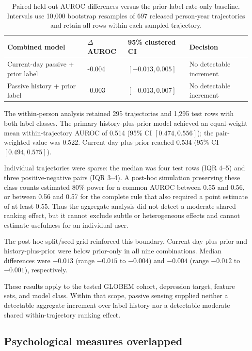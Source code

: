 \documentclass[a4paper,11pt,oneside]{report}
\begin{document}
\begin{table}[H]
\centering
\small
\caption[RQ1 trajectory-clustered inference]{Paired held-out AUROC differences
versus the prior-label-rate-only baseline. Intervals use 10,000 bootstrap resamples
of 697 released person-year trajectories and retain all rows within each sampled
trajectory.}
\label{tab:rq1-clustered}
\begin{tabularx}{\textwidth}{@{}L{0.34\textwidth}C{0.12\textwidth}
C{0.22\textwidth}Y@{}}
\toprule
Combined model & $\Delta$ AUROC & 95\% clustered CI & Decision \\
\midrule
Current-day passive + prior label & -0.004 & $[-0.013,0.005]$ & No detectable increment \\
Passive history + prior label & -0.003 & $[-0.013,0.007]$ & No detectable increment \\
\bottomrule
\end{tabularx}
\end{table}

The within-person analysis retained 295 trajectories and 1,295 test rows with both
label classes. The primary history-plus-prior model achieved an equal-weight mean
within-trajectory AUROC of 0.514 (95\% CI $[0.474,0.556]$); the pair-weighted value
was 0.522. Current-day-plus-prior reached 0.534 (95\% CI $[0.494,0.575]$).

Individual trajectories were sparse: the median was four test rows (IQR 4--5) and
three positive-negative pairs (IQR 3--4). A post-hoc simulation preserving these
class counts estimated 80\% power for a common AUROC between 0.55 and 0.56, or
between 0.56 and 0.57 for the complete rule that also required a point estimate of
at least 0.55. Thus the aggregate analysis did not detect a moderate shared ranking
effect, but it cannot exclude subtle or heterogeneous effects and cannot estimate
usefulness for an individual user.

The post-hoc split/seed grid reinforced this boundary. Current-day-plus-prior and
history-plus-prior were below prior-only in all nine combinations. Median differences
were $-0.013$ (range $-0.015$ to $-0.004$) and $-0.004$ (range $-0.012$ to
$-0.001$), respectively.

These results apply to the tested GLOBEM cohort, depression target, feature sets, and
model class. Within that scope, passive sensing supplied neither a detectable
aggregate increment over label history nor a detectable moderate shared
within-trajectory ranking effect.

\subsection{Psychological measures overlapped}
\end{document}
